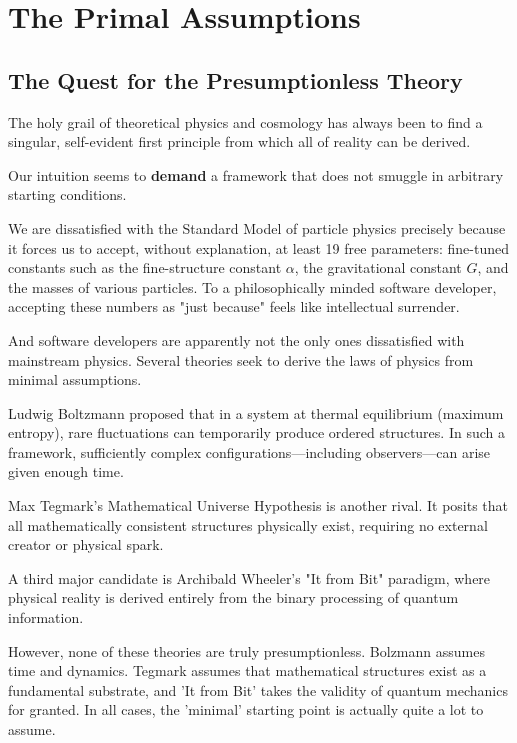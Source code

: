 \chapter{The Primal Assumptions}
\label{chap:primal-assumptions}

\section{The Quest for the Presumptionless Theory}

The holy grail of theoretical physics and cosmology has always been to find a singular,
self-evident first principle from which all of reality can be derived.

Our intuition seems to \textbf{demand} a framework that does not smuggle in arbitrary starting conditions.

We are dissatisfied with the Standard Model of particle physics precisely because it forces us to accept, without explanation, at least 19 free parameters: fine-tuned constants such as the fine-structure constant $\alpha$, the gravitational constant $G$, and the masses of various particles.
To a philosophically minded software developer, accepting these numbers as "just because" feels like intellectual surrender.

And software developers are apparently not the only ones dissatisfied with mainstream physics.
Several theories seek to derive the laws of physics from minimal assumptions.

Ludwig Boltzmann proposed that in a system at thermal equilibrium (maximum entropy), rare fluctuations can temporarily produce ordered structures.
In such a framework, sufficiently complex configurations—including observers—can arise given enough time. 

Max Tegmark's Mathematical Universe Hypothesis is another rival.
It posits that all mathematically consistent structures physically exist, requiring no external creator or physical spark.

A third major candidate is Archibald Wheeler's "It from Bit" paradigm, where physical reality is derived entirely from the binary processing of quantum information.

However, none of these theories are truly presumptionless. Bolzmann assumes time and dynamics.
Tegmark assumes that mathematical structures exist as a fundamental substrate, and 'It from Bit' takes the validity of quantum mechanics for granted.
In all cases, the 'minimal' starting point is actually quite a lot to assume.


